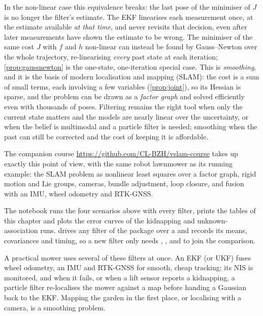In the non-linear case this equivalence breaks: the last pose of the
minimiser of $J$ is no longer the filter's estimate. The EKF linearises
each
measurement once, at the estimate available \emph{at that time}, and
never revisits that decision, even after later measurements have shown the
estimate to be wrong. The minimiser of the same cost $J$ with $f$ and $h$
non-linear can instead be found by Gauss--Newton over the whole
trajectory, re-linearising \emph{every} past state at each iteration;
\cref{prop:gaussnewton} is the one-state, one-iteration special case. This
is \emph{smoothing}, and it is the basis of modern localisation and
mapping (SLAM): the cost is a sum of small terms, each involving a few
variables (\cref{prop:joint}), so its Hessian is sparse, and the problem
can be drawn as a \emph{factor graph} and solved efficiently even with
thousands of poses. Filtering remains the right tool when only the current
state matters and the models are nearly linear over the uncertainty, or
when the belief is multimodal and a particle filter is needed; smoothing
when the past can still be corrected and the cost of keeping it is
affordable.

The companion course \url{https://github.com/CL-BZH/vslam-course} takes
up exactly this point of view, with the same robot lawnmower as its running
example: the SLAM problem as nonlinear least squares over a factor graph,
rigid motion and Lie groups, cameras, bundle adjustment, loop closure, and
fusion with an IMU, wheel odometry and RTK-GNSS.

\begin{practice}
The notebook runs the four scenarios above with every filter, prints the
tables of this chapter and plots the error curves of the kidnapping and
unknown-association runs.  drives any filter of the
package over a  and records its means, covariances and timing,
so a new filter only needs , ,  and
 to join the comparison.
\end{practice}

\begin{mower}
A practical mower uses several of these filters at once. An EKF (or UKF)
fuses wheel odometry, an IMU and RTK-GNSS for smooth, cheap tracking;
its NIS is monitored, and when it fails, or when a lift sensor reports a
kidnapping, a particle filter re-localises the mower against a map before
handing a Gaussian back to the EKF. Mapping the garden in the first
place, or localising with a camera, is a smoothing problem.
\end{mower}

